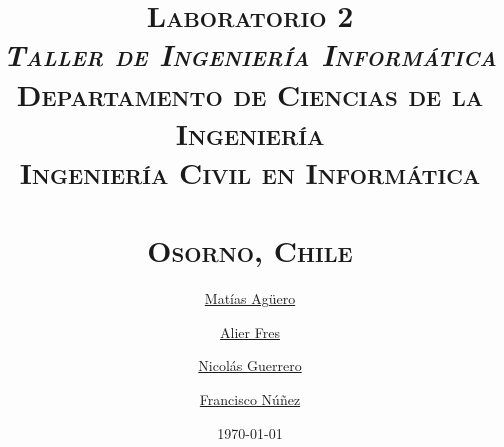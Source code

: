\documentclass[letter,12pt]{report}
\def\TITULO{Laboratorio 2}
\def\subtitulo{Taller de Ingeniería Informática}
\def\asignatura{}
\def\campus{Osorno}
\def\carrera{Ingeniería Civil en Informática}
\begin{document}
\setlength{\unitlength}{1 cm} %
\thispagestyle{empty}

\AddToShipoutPicture*{\BackgroundPic}
{\color{white}
   \title{\scshape\Huge{\TITULO}\\
  \scshape \large{\textit{\subtitulo}}\\ 
\vspace{1cm} 
        \Large Departamento de Ciencias de la Ingeniería\\
        \Large \carrera\\
        \Large \asignatura\\
        \large \campus, Chile}
   \author{
   \href{mailto:matiasjavier.aguero@alumnos.ulagos.cl}{Matías Agüero}
      \and \href{mailto:alier.fres@alumnos.ulagos.cl}{Alier Fres}
      \and \href{mailto:nicolasandres.guerrero@alumnos.ulagos.cl}{Nicolás Guerrero}
      \and \href{mailto:franciscojoaquin.nunez@alumnos.ulagos.cl}{Francisco Núñez}
   } 
   \date{\vspace{3cm}\today}
   \maketitle
   \ClearShipoutPicture
   }
\cleardoublepage
{}
\setcounter{page}{1}

\tableofcontents
\listoffigures


\end{document}
